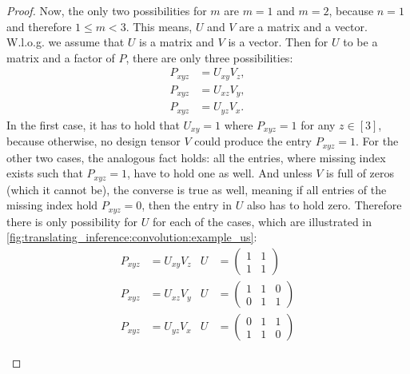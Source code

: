 \begin{proof}
    Now, the only two possibilities for $m$ are $m = 1$ and $m = 2$, because $n = 1$ and therefore $1 \leq m < 3$.
    This means, $U$ and $V$ are a matrix and a vector.
    W.l.o.g. we assume that $U$ is a matrix and $V$ is a vector.
    Then for $U$ to be a matrix and a factor of $P$, there are only three possibilities:
    \begin{align*}
        P_{xyz} & = U_{xy} V_z, \\
        P_{xyz} & = U_{xz} V_y, \\
        P_{xyz} & = U_{yz} V_x.
    \end{align*}
    In the first case, it has to hold that $U_{xy} = 1$ where $P_{xyz} = 1$ for any $z \in [3]$,
    because otherwise, no design tensor $V$ could produce the entry $P_{xyz} = 1$.
    For the other two cases, the analogous fact holds:
    all the entries, where missing index exists such that $P_{xyz} = 1$, have to hold one as well.
    And unless $V$ is full of zeros (which it cannot be), the converse is true as well,
    meaning if all entries of the missing index hold $P_{xyz} = 0$, then the entry in $U$ also has to hold zero.
    Therefore there is only possibility for $U$ for each of the cases, which are illustrated in \cref{fig:translating_inference:convolution:example_us}:
    \begin{align*}
        P_{xyz} & = U_{xy} V_z & U & = \begin{pmatrix} 1 & 1 \\ 1 & 1 \end{pmatrix} \\
        P_{xyz} & = U_{xz} V_y & U & = \begin{pmatrix} 1 & 1 & 0 \\ 0 & 1 & 1 \end{pmatrix} \\
        P_{xyz} & = U_{yz} V_x & U & = \begin{pmatrix} 0 & 1 & 1 \\ 1 & 1 & 0 \end{pmatrix}
    \end{align*}
    \begin{figure}
        \centering
        \begin{subfigure}{0.3\textwidth}
\end{subfigure}
\end{figure}
\end{proof}
